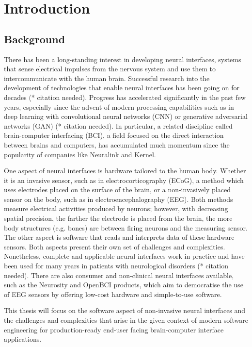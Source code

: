 \chapter{Introduction}
\graphicspath{{Chapter1/Figs/}{Chapter1/Figs/}}

\section{Background}
\label{chapter1-background}

There has been a long-standing interest in developing neural interfaces, systems that sense electrical impulses from the nervous system and use them to intercommunicate with the human brain. Successful research into the development of technologies that enable neural interfaces has been going on for decades (* citation needed). Progress has accelerated significantly in the past few years, especially since the advent of modern processing capabilities such as in deep learning with convolutional neural networks (CNN) or generative adversarial networks (GAN) (* citation needed). In particular, a related discipline called brain-computer interfacing (BCI), a field focused on the direct interaction between brains and computers, has accumulated much momentum since the popularity of companies like Neuralink and Kernel.

One aspect of neural interfaces is hardware tailored to the human body. Whether it is an invasive sensor, such as in electrocorticography (ECoG), a method which uses electrodes placed on the surface of the brain, or a non-invasively placed sensor on the body, such as in electroencephalography (EEG). Both methods measure electrical activities produced by neurons; however, with decreasing spatial precision, the farther the electrode is placed from the brain, the more body structures (e.g. bones) are between firing neurons and the measuring sensor. The other aspect is software that reads and interprets data of these hardware sensors. Both aspects present their own set of challenges and complexities. Nonetheless, complete and applicable neural interfaces work in practice and have been used for many years in patients with neurological disorders (* citation needed). There are also consumer and non-clinical neural interfaces available, such as the Neurosity and OpenBCI products, which aim to democratise the use of EEG sensors by offering low-cost hardware and simple-to-use software.

This thesis will focus on the software aspect of non-invasive neural interfaces and the challenges and complexities that arise in the given context of modern software engineering for production-ready end-user facing brain-computer interface applications.

